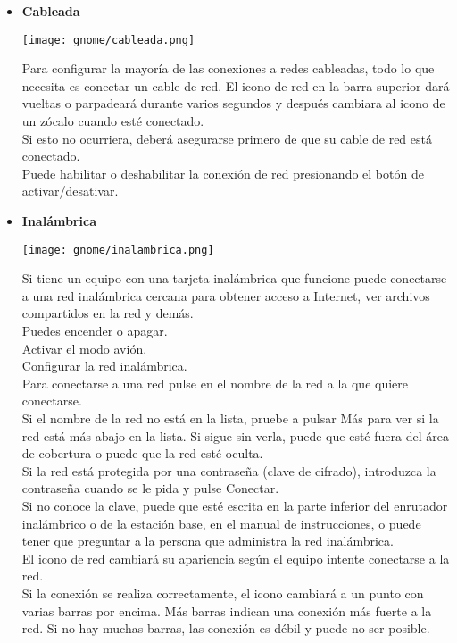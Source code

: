 \begin{itemize}
\item{\bf Cableada}
\begin{center}
\texttt{[image: gnome/cableada.png]} 
\end{center}
Para configurar la mayoría de las conexiones a redes cableadas, todo lo que necesita es conectar un cable de red. El icono de red en la barra superior dará vueltas o parpadeará durante varios segundos y después cambiara al icono de un zócalo cuando esté conectado.\\
Si esto no ocurriera, deberá asegurarse primero de que su cable de red está conectado.\\

Puede habilitar o deshabilitar la conexión de red presionando el botón de activar/desativar.
\newpage
\item{\bf Inalámbrica}
\begin{center}
\texttt{[image: gnome/inalambrica.png]} 
\end{center}
Si tiene un equipo con una tarjeta inalámbrica que funcione puede conectarse a una red inalámbrica cercana para obtener acceso a Internet, ver archivos compartidos en la red y demás.\\

Puedes encender o apagar.\\
Activar el modo avión.\\
Configurar la red inalámbrica.\\

Para conectarse a una red pulse en el nombre de la red a la que quiere conectarse.\\
Si el nombre de la red no está en la lista, pruebe a pulsar Más para ver si la red está más abajo en la lista. Si sigue sin verla, puede que esté fuera del área de cobertura o puede que la red esté oculta.\\
Si la red está protegida por una contraseña (clave de cifrado), introduzca la contraseña cuando se le pida y pulse Conectar.\\
Si no conoce la clave, puede que esté escrita en la parte inferior del enrutador inalámbrico o de la estación base, en el manual de instrucciones, o puede tener que preguntar a la persona que administra la red inalámbrica.\\
El icono de red cambiará su apariencia según el equipo intente conectarse a la red.\\
Si la conexión se realiza correctamente, el icono cambiará a un punto con varias barras por encima. Más barras indican una conexión más fuerte a la red. Si no hay muchas barras, las conexión es débil y puede no ser posible.\\


\end{itemize}
